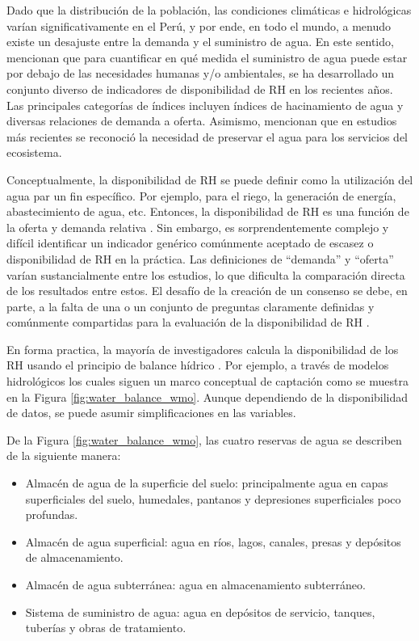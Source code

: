\documentclass[12pt]{article}
\begin{document}
Dado que la distribución de la población, las condiciones climáticas e hidrológicas varían significativamente en el Perú, y por ende, en todo el mundo, a menudo existe un desajuste entre la demanda y el suministro de agua. En este sentido, \citet{xu2017water} mencionan que para cuantificar en qué medida el suministro de agua puede estar por debajo de las necesidades humanas y/o ambientales, se ha desarrollado un conjunto diverso de indicadores de disponibilidad de RH en los recientes años. Las principales categorías de índices incluyen índices de hacinamiento de agua y diversas relaciones de demanda a oferta. Asimismo, mencionan que en estudios más recientes se reconoció la necesidad de preservar el agua para los servicios del ecosistema.

Conceptualmente, la disponibilidad de RH se puede definir como la utilización del agua par un fin específico. Por ejemplo, para el riego, la generación de energía, abastecimiento de agua, etc. Entonces, la disponibilidad de RH es una función de la oferta y demanda relativa \citep{averyt2013sectoral}. Sin embargo, es sorprendentemente complejo y difícil identificar un indicador genérico comúnmente aceptado de escasez o disponibilidad de RH en la práctica. Las definiciones de “demanda” y “oferta” varían sustancialmente entre los estudios, lo que dificulta la comparación directa de los resultados entre estos. El desafío de la creación de un consenso se debe, en parte, a la falta de una o un conjunto de preguntas claramente definidas y comúnmente compartidas para la evaluación de la disponibilidad de RH \citep{xu2017water}.

\clearpage
En forma practica, la mayoría de investigadores calcula la disponibilidad de los RH usando el principio de balance hídrico \citep{WMO2012,PNRH2013,juniati2018proposing}. Por ejemplo, a través de modelos hidrológicos los cuales siguen un marco conceptual de captación como se muestra en la Figura \ref{fig:water_balance_wmo}. Aunque dependiendo de la disponibilidad de datos, se puede asumir simplificaciones en las variables.



De la Figura \ref{fig:water_balance_wmo}, las cuatro reservas de agua se describen de la siguiente manera:

\begin{itemize}
    \item Almacén de agua de la superficie del suelo: principalmente agua en capas superficiales del suelo, humedales, pantanos y depresiones superficiales poco profundas.
    
    \item Almacén de agua superficial: agua en ríos, lagos, canales, presas y depósitos de almacenamiento.
    
    \item Almacén de agua subterránea: agua en almacenamiento subterráneo.
    
    \item Sistema de suministro de agua: agua en depósitos de servicio, tanques, tuberías y obras de tratamiento.
    
\end{itemize}
\end{document}
